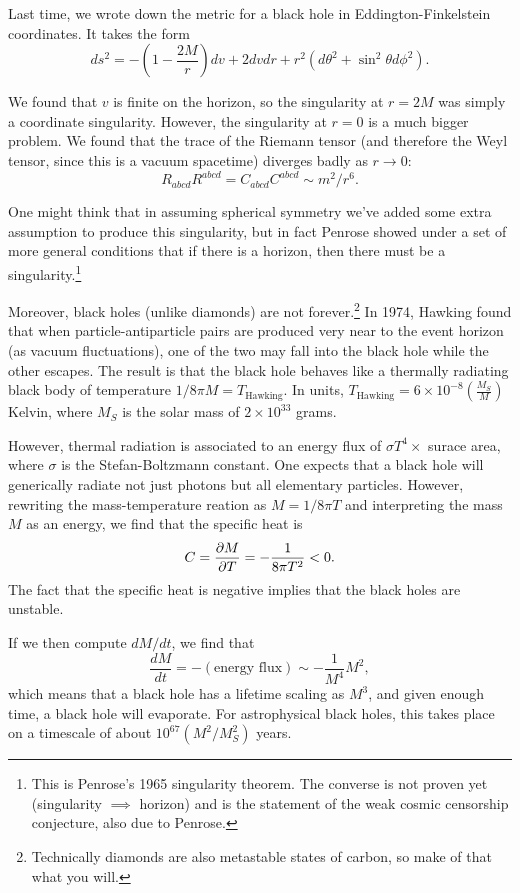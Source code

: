 Last time, we wrote down the metric for a black hole in Eddington-Finkelstein coordinates. It takes the form
$$ds^2=-\left(1-\frac{2M}{r}\right) dv+2dvdr+r^2 (d\theta^2+\sin^2 \theta d\phi^2).$$

We found that $v$ is finite on the horizon, so the singularity at $r=2M$ was simply a coordinate singularity. However, the singularity at $r=0$ is a much bigger problem. We found that the trace of the Riemann tensor (and therefore the Weyl tensor, since this is a vacuum spacetime) diverges badly as $r\to 0$:
$$R_{abcd}R^{abcd}=C_{abcd}C^{abcd}\sim m^2/r^6.$$

One might think that in assuming spherical symmetry we've added some extra assumption to produce this singularity, but in fact Penrose showed under a set of more general conditions that if there is a horizon, then there must be a singularity.\footnote{This is Penrose's 1965 singularity theorem. The converse is not proven yet (singularity $\implies$ horizon) and is the statement of the weak cosmic censorship conjecture, also due to Penrose.}

Moreover, black holes (unlike diamonds) are not forever.\footnote{Technically diamonds are also metastable states of carbon, so make of that what you will.} In 1974, Hawking found that when particle-antiparticle pairs are produced very near to the event horizon (as vacuum fluctuations), one of the two may fall into the black hole while the other escapes. The result is that the black hole behaves like a thermally radiating black body of temperature $1/8\pi M=T_{\text{Hawking}}$. In units, $T_{\text{Hawking}}=6\times 10^{-8}\left(\frac{M_S}{M}\right)$ Kelvin, where $M_S$ is the solar mass of $2\times 10^{33}$ grams.

However, thermal radiation is associated to an energy flux of $\sigma T^4\times$ surace area, where $\sigma$ is the Stefan-Boltzmann constant. One expects that a black hole will generically radiate not just photons but all elementary particles. However, rewriting the mass-temperature reation as $M=1/8\pi T$ and interpreting the mass $M$ as an energy, we find that the specific heat is
$$C=\P{M}{T}=-\frac{1}{8\pi T^2}<0.$$
The fact that the specific heat is negative implies that the black holes are unstable.

If we then compute $dM/dt$, we find that
$$\frac{dM}{dt}=-(\text{energy flux})\sim -\frac{1}{M^4}M^2,$$
which means that a black hole has a lifetime scaling as $M^3$, and given enough time, a black hole will evaporate. For astrophysical black holes, this takes place on a timescale of about $10^{67}(M^2/M_S^2)$ years.

